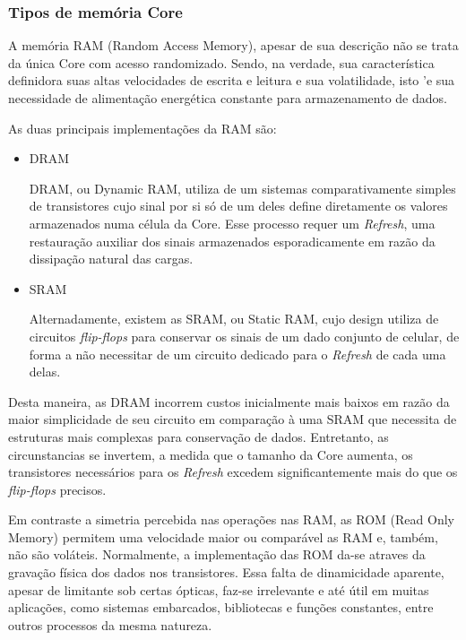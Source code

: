 \documentclass[12pt]{article}
\begin{document}
\subsubsection*{Tipos de memória Core}
A memória RAM (Random Access Memory), apesar de sua descrição não se trata da única Core com acesso randomizado. Sendo, na verdade, sua característica definidora suas altas velocidades de escrita e leitura e sua volatilidade, isto 'e sua necessidade de alimentação energética constante para armazenamento de dados.

As duas principais implementações da RAM são:
\begin{itemize}

\item DRAM

DRAM, ou Dynamic RAM, utiliza de um sistemas comparativamente simples de transistores cujo sinal por si só de um deles define diretamente os valores armazenados numa célula da Core. Esse processo requer um \textit{Refresh}, uma restauração auxiliar dos sinais armazenados esporadicamente em razão da dissipação natural das cargas. 

\item SRAM

Alternadamente, existem as SRAM, ou Static RAM, cujo design utiliza de circuitos \textit{flip-flops} para conservar os sinais de um dado conjunto de celular, de forma a não necessitar de um circuito dedicado para o \textit{Refresh} de cada uma delas. 

\end{itemize}

Desta maneira, as DRAM incorrem custos inicialmente mais baixos em razão da maior simplicidade de seu circuito em comparação à uma SRAM que necessita de estruturas mais complexas para conservação de dados. Entretanto, as circunstancias se invertem, a medida que o tamanho da Core aumenta, os transistores necessários para os \textit{Refresh} excedem significantemente mais do que os \textit{flip-flops} precisos.

Em contraste a simetria percebida nas operações nas RAM, as ROM (Read Only Memory) permitem uma velocidade maior ou comparável as RAM e, também, não são voláteis. Normalmente, a implementação das ROM da-se atraves da gravação física dos dados nos transistores. Essa falta de dinamicidade aparente, apesar de limitante sob certas ópticas, faz-se irrelevante e até útil em muitas aplicações, como sistemas embarcados, bibliotecas e funções constantes, entre outros processos da mesma natureza.
\end{document}
